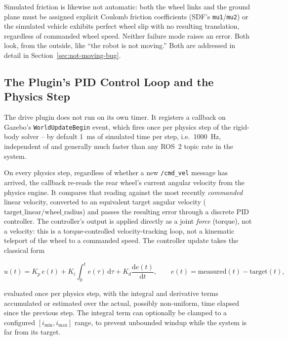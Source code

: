 Simulated friction is likewise not automatic: both the wheel links
and the ground plane must be assigned explicit Coulomb friction
coefficients (SDF's \texttt{mu1}/\texttt{mu2}) or the simulated
vehicle exhibits perfect wheel slip with no resulting translation,
regardless of commanded wheel speed. Neither failure mode raises an
error. Both look, from the outside, like ``the robot is not
moving.'' Both are addressed in detail in
Section~\ref{sec:not-moving-bug}.

\subsection{The Plugin's PID Control Loop and the Physics Step}
\label{sec:gazebo-pid-loop}

The drive plugin does not run on its own timer. It registers a
callback on Gazebo's \texttt{WorldUpdateBegin} event, which fires
once per physics step of the rigid-body solver -- by default
\SI{1}{\milli\second} of simulated time per step, i.e.\
\SI{1000}{\hertz}, independent of and generally much faster than any
ROS~2 topic rate in the system.

On every physics step, regardless of whether a new
\texttt{/cmd\_vel} message has arrived, the callback re-reads the
rear wheel's current angular velocity from the physics engine. It
compares that reading against the most recently \emph{commanded}
linear velocity, converted to an equivalent target angular velocity
($\text{target\_linear} / \text{wheel\_radius}$) and passes the
resulting error through a discrete PID controller. The controller's
output is applied directly as a joint \emph{force} (torque), not a
velocity: this is a torque-controlled velocity-tracking loop, not a
kinematic teleport of the wheel to a commanded speed. The controller
update takes the classical form \cite{astrom2008feedback}

\begin{equation}
  u(t) = K_p\, e(t) + K_i \int_0^t e(\tau)\, \mathrm{d}\tau + K_d \frac{\mathrm{d}e(t)}{\mathrm{d}t},
  \qquad e(t) = \text{measured}(t) - \text{target}(t),
  \label{eq:pid}
\end{equation}

evaluated once per physics step, with the integral and derivative
terms accumulated or estimated over the actual, possibly
non-uniform, time elapsed since the previous step. The integral term
can optionally be clamped to a configured $[i_{\min}, i_{\max}]$
range, to prevent unbounded windup while the system is far from its
target.


